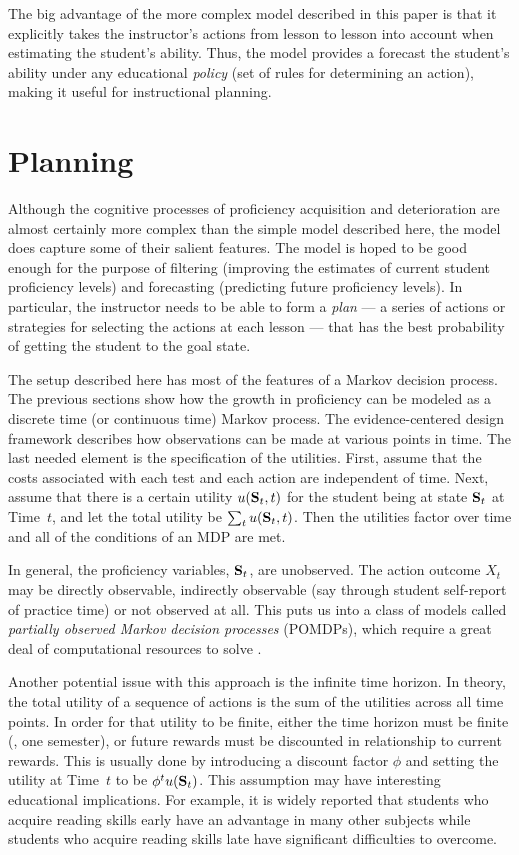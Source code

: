\documentclass[12pt]{RR-article}
\begin{document}
The big advantage of the more complex model described in this paper is
that it explicitly takes the instructor's actions from lesson to
lesson into account when estimating the student's ability.  Thus, the
model provides a forecast the student's ability under any educational
{\it policy\/} (set of rules for determining an action), making it
useful for instructional planning.


\section{Planning}
\label{sect:Planning}

Although the cognitive processes of proficiency acquisition and
deterioration are almost certainly more complex than the simple model
described here, the model does capture some of their salient features.
The model is hoped to be good enough for the purpose of filtering
(improving the estimates of current student proficiency levels) and
forecasting (predicting future proficiency levels).  In particular,
the instructor needs to be able to form a \textit{plan\/} --- a series
of actions or strategies for selecting the actions at each lesson ---
that has the best probability of getting the student to the goal
state.

The setup described here has most of the features of a Markov decision
process.  The previous sections show how the growth in proficiency can
be modeled as a discrete time (or continuous time) Markov process. The
evidence-centered design framework describes how observations can be
made at various points in time.  The last needed element is the
specification of the utilities.  First, assume that the costs
associated with each test and each action are independent of time.
Next, assume that there is a certain utility $u({\bf S}_t,t)$ for the
student being at state ${\bf S}_t$ at Time~$t$, and let the total
utility be $\sum_t u({\bf S}_t,t)$.  Then the utilities factor over
time and all of the conditions of an MDP are met.

In general, the proficiency variables, ${\bf S}_t$, are
unobserved.  The action outcome $X_t$ may be directly observable,
indirectly observable (say through student self-report of practice
time) or not observed at all.  This puts us into a class of models
called \textit{partially observed Markov decision processes\/}
(POMDPs), which require a great deal of computational resources to
solve \cite{Mundhenk2000}.

Another potential issue with this approach is the infinite time
horizon.  In theory, the total utility of a sequence of actions is
the sum of the utilities across all time points.  In order for that
utility to be finite, either the time horizon must be finite (\ie, one
semester), or future rewards must be discounted in relationship to
current rewards.  This is usually done by introducing a discount
factor $\phi$ and setting the utility at Time~$t$ to be $\phi^t u({\bf
S}_t)$.  This assumption may have interesting educational
implications.  For example, it is widely reported that students who
acquire reading skills early have an advantage in many other subjects
while students who acquire reading skills late have significant
difficulties to overcome.
\end{document}
